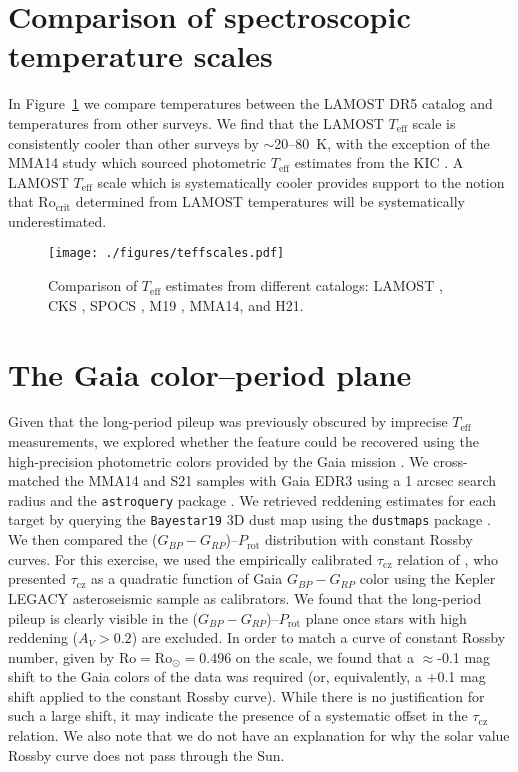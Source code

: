 \documentclass[trackchanges,twocolumn]{aastex631}
\newcommand{\taucz}{$\tau_\mathrm{cz}$\xspace}
\newcommand{\rocrit}{$\mathrm{Ro_{crit}}$\xspace}
\newcommand{\mma}{MMA14\xspace}
\newcommand{\hall}{H21\xspace}
\newcommand{\santos}{S21\xspace}
\newcommand{\teff}{\ensuremath{T_{\mathrm{eff}}}\xspace}
\newcommand{\prot}{\ensuremath{P_\mathrm{rot}}\xspace}
\begin{document}
\section{Comparison of spectroscopic temperature scales}\label{app:teff}

In Figure~\ref{fig:teffscales} we compare temperatures between the LAMOST DR5 catalog \citep{Xiang2019} and temperatures from other surveys. We find that the LAMOST \teff scale is consistently cooler than other surveys by $\sim$20--80~K, with the exception of the \mma study which sourced photometric \teff estimates from the KIC \citep{Brown2011}. A LAMOST \teff scale which is systematically cooler provides support to the notion that \rocrit determined from LAMOST temperatures will be systematically underestimated. 

\begin{figure}
    \centering
    \texttt{[image: ./figures/teffscales.pdf]}
    \caption{Comparison of \teff estimates from different catalogs: LAMOST \citep{Xiang2019}, CKS \citep{Fulton2018}, SPOCS \citep{Brewer2018}, M19 \citep{Martinez2019}, \mma, and \hall.}
    \label{fig:teffscales}
\end{figure}


\section{The Gaia color–period plane}\label{app:gaia}
Given that the long-period pileup was previously obscured by imprecise \teff measurements, we explored whether the feature could be recovered using the high-precision photometric colors provided by the Gaia mission \citep{Gaia2016}. We cross-matched the \mma and \santos samples with Gaia EDR3 \citep{GaiaEDR3} using a 1 arcsec search radius and the \texttt{astroquery} package \citep{astroquery}. We retrieved reddening estimates for each target by querying the \texttt{Bayestar19} 3D dust map using the \texttt{dustmaps} package \citep{dustmaps, Green2019}. We then compared the ($G_{BP}-G_{RP}$)–\prot distribution with constant Rossby curves. For this exercise, we used the empirically calibrated \taucz relation of \citet{Corsaro2021}, who presented \taucz as a quadratic function of Gaia $G_{BP}-G_{RP}$ color using the Kepler LEGACY asteroseismic sample as calibrators. We found that the long-period pileup is clearly visible in the ($G_{BP}-G_{RP}$)–\prot plane once stars with high reddening ($A_V>0.2$) are excluded. In order to match a curve of constant Rossby number, given by $\mathrm{Ro}=\mathrm{Ro_\odot}=0.496$ on the \citet{Corsaro2021} scale, we found that a $\approx$-0.1 mag shift to the Gaia colors of the data was required (or, equivalently, a +0.1 mag shift applied to the constant Rossby curve). While there is no justification for such a large shift, it may indicate the presence of a systematic offset in the \taucz relation. We also note that we do not have an explanation for why the solar value Rossby curve does not pass through the Sun.
\end{document}
